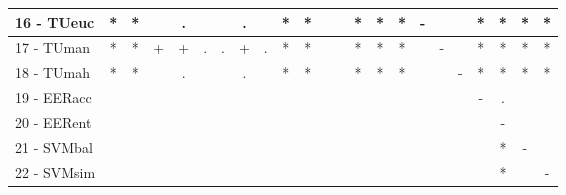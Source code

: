 \begin{table}[h]
\begin{center}
\begin{tabular}{lcc|cc|cc|cc|cc|cc|cc|cc|cc|cc|cc}
16 - TUeuc	& * & * &   & . &   &   & . &   & * & * &   &   & * & * & * & - &   &   & * & * & * & * \\ \hline
17 - TUman	& * & * & + & + & . & . & + & . & * & * &   &   & * & * & * &   & - &   & * & * & * & * \\
18 - TUmah	& * & * &   & . &   &   & . &   & * & * &   &   & * & * & * &   &   & - & * & * & * & * \\ \hline
19 - EERacc	&   &   &   &   &   &   &   &   &   &   &   &   &   &   &   &   &   &   & - & . &   &   \\
20 - EERent	&   &   &   &   &   &   &   &   &   &   &   &   &   &   &   &   &   &   &   & - &   &   \\ \hline
21 - SVMbal	&   &   &   &   &   &   &   &   &   &   &   &   &   &   &   &   &   &   &   & * & - &   \\
22 - SVMsim	&   &   &   &   &   &   &   &   &   &   &   &   &   &   &   &   &   &   &   & * &   & - \\ \hline\end{tabular}
\label{stratsfriedCIELM}
\end{center}
\end{table}